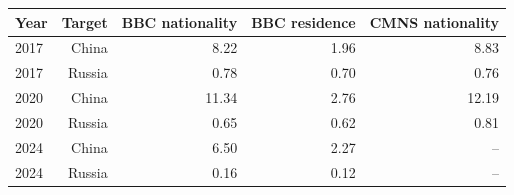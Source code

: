 \begin{tabular}{lrrrr}
\toprule
Year & Target & BBC nationality & BBC residence & CMNS nationality \\
\midrule
2017 & China & 8.22 & 1.96 & 8.83 \\
2017 & Russia & 0.78 & 0.70 & 0.76 \\
2020 & China & 11.34 & 2.76 & 12.19 \\
2020 & Russia & 0.65 & 0.62 & 0.81 \\
2024 & China & 6.50 & 2.27 & -- \\
2024 & Russia & 0.16 & 0.12 & -- \\
\bottomrule
\end{tabular}
